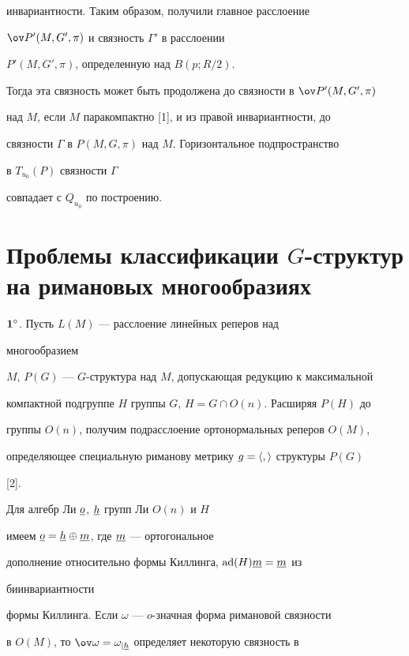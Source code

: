\begin{pf}
инвариантности. Таким образом, получили главное расслоение


$\ov P{}'(M,G',\pi)$ и связность $\Gamma'$ в расслоении


$P{}'(M,G',\pi)$, определенную над $B(p;R/2)$. 


Тогда эта связность может быть продолжена до связности в $\ov 


P{}'(M,G',\pi)$ 


над $M$, если $M$ паракомпактно [1], и из правой инвариантности, до 


связности $\Gamma$ в $P(M,G,\pi)$ над $M$. Горизонтальное подпространство 


в $T_{u_0}(P)$ связности $\Gamma$ 


совпадает с $Q_{u_0}$ по построению. 


\end{pf} 


 


 


\section{Проблемы классификации $G$-структур на римановых многообразиях} 


 


$\bold 1^\circ$. Пусть $L(M)$ --- расслоение линейных реперов над 


многообразием 


$M$, $P(G)$ --- $G$-структура над $M$, допускающая редукцию к максимальной 


компактной подгруппе $H$ группы $G$, $H=G\cap O(n)$. Расширяя $P(H)$ до 


группы $O(n)$, получим подрасслоение ортонормальных реперов $O(M)$, 


определяющее специальную риманову метрику $g=\langle,\rangle$ структуры $P(G)$ 


[2]. 


Для алгебр Ли $\underline o$, $\underline h$ групп Ли $O(n)$ и $H$


имеем $\underline o=\underline h\oplus \underline m$, где $\underline m$ --- ортогональное 


дополнение относительно формы Киллинга, $\operatorname{ad}(H)\underline m=\underline m$ из 


биинвариантности 


формы Киллинга. Если $\omega$ --- $o$-значная форма римановой связности 


в $O(M)$, то $\ov\omega=\omega_{|\ul h}$ определяет некоторую связность в 


